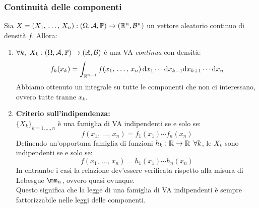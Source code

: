 \subsubsection{Continuità delle componenti}

\begin{teob}[\JPTh{12.2}]
  Sia $X = (X_1, \, \dots, \, X_n): \DoCo$ un vettore aleatorio continuo di densità $f$. Allora:
  \begin{enumerate}
    \item $\forall k, \ X_k: \DoCo[1]$ è una VA \emph{continua} con densità:
    $$ f_k(x_k) = \int_{\mathbb R^{n-1}} f(x_1, \, \dots, \, x_n) \, \mathrm d x_1 \cdots \mathrm d x_ {k-1} \mathrm d x_{k+1} \cdots \mathrm d x_n $$
    Abbiamo ottenuto un integrale su tutte le componenti che non ci interessano, ovvero tutte tranne $x_k$.
    \item \textbf{Criterio sull'indipendenza:} \\
    $\{X_k\}_{k=1,\dots,n}$ è una famiglia di VA indipendenti se e solo se:
      $$f(x_1, \, \dots, \, x_n) = f_1(x_1) \cdots f_n(x_n)$$
    Definendo un'opportuna famiglia di funzioni $h_k: \mathbb R \to \mathbb R \enspace \forall k$, le $X_k$ sono indipendenti se e solo se:
      $$f(x_1, \, \dots, \, x_n) = h_1(x_1) \cdots h_n(x_n)$$
    In entrambe i casi la relazione dev'essere verificata rispetto alla misura di Lebesgue $\mm_n$, ovvero quasi ovunque.\\
    Questo significa che la legge di una famiglia di VA indipendenti è sempre fattorizzabile nelle leggi delle componenti.
  \end{enumerate}
\end{teob}

